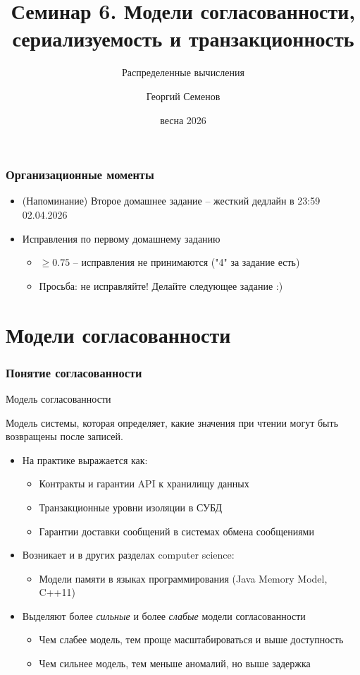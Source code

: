 \documentclass{beamer}
\title{Семинар 6. Модели согласованности, сериализуемость и транзакционность}
\subtitle{Распределенные вычисления}
\author{Георгий Семенов}
\institute{Институт прикладных компьютерных наук \\ Университет ИТМО}
\date{весна 2026}
\newenvironment{definitionbox}[1][Определение]{%
  \begin{exampleblock}{#1}
}{%
  \end{exampleblock}
}
\begin{document}
\frame{\titlepage}

\begin{frame}
\frametitle{Организационные моменты}

\begin{itemize}
  \item (Напоминание) Второе домашнее задание – жесткий дедлайн в 23:59 02.04.2026
  \item Исправления по первому домашнему заданию
    \begin{itemize}
    \item $\geq 0.75$ – исправления не принимаются ("4" за задание есть)
    \item Просьба: не исправляйте! Делайте следующее задание :)
    \end{itemize}
\end{itemize}

\end{frame}

\section{Модели согласованности}

\begin{frame}
\frametitle{Понятие согласованности}

\begin{definitionbox}[Модель согласованности]
Модель системы, которая определяет, какие значения при чтении могут быть возвращены после записей.
\end{definitionbox}

\begin{itemize}
    \item На практике выражается как:
    \begin{itemize}
        \item Контракты и гарантии API к хранилищу данных
        \item Транзакционные уровни изоляции в СУБД
        \item Гарантии доставки сообщений в системах обмена сообщениями
    \end{itemize}

    \item Возникает и в других разделах computer science:
    \begin{itemize}
        \item Модели памяти в языках программирования (Java Memory Model, C++11)
    \end{itemize}

    \item Выделяют более {\itshape сильные} и более {\itshape слабые} модели согласованности
    \begin{itemize}
        \item Чем слабее модель, тем проще масштабироваться и выше доступность
        \item Чем сильнее модель, тем меньше аномалий, но выше задержка
    \end{itemize}
\end{itemize}

\end{frame}
\end{document}
